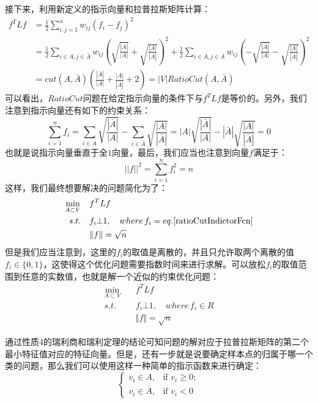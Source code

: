 \documentclass[UTF8, 12pt]{ctexart}
\begin{document}
接下来，利用新定义的指示向量和拉普拉斯矩阵计算：
\begin{align}
	{f^T}Lf & = \frac{1}{2}\sum\limits_{i,j = 1}^n {{w_{ij}}{{({f_i} - {f_j})}^2}} \\
	 & = \frac{1}{2}\sum\limits_{i \in A,j \in \bar A} {{w_{ij}}{{(\sqrt {\frac{{|\bar A|}}{{|A|}}}  + \sqrt {\frac{{|A|}}{{|\bar A|}}} )}^2}}  + \frac{1}{2}\sum\limits_{i \in A,j \in \bar A} {{w_{ij}}{{( - \sqrt {\frac{{|\bar A|}}{{|A|}}}  - \sqrt {\frac{{|A|}}{{|\bar A|}}} )}^2}} \\
	 & = cut(A,\bar A)(\frac{{|\bar A|}}{{|A|}} + \frac{{|A|}}{{|\bar A|}} + 2) = |V|RatioCut(A,\bar A)
\end{align}
可以看出，$RatioCut$问题在给定指示向量的条件下与${f^{T}Lf}$是等价的。另外，我们注意到指示向量还有如下的约束关系：
\begin{equation}
\sum\limits_{i = 1}^n {{f_i} = \sum\limits_{i \in A} {\sqrt {\frac{{|\bar A|}}{{|A|}}} } }  - \sum\limits_{i \in \bar A} {\sqrt {\frac{{|A|}}{{|\bar A|}}} }  = |A|\sqrt {\frac{{|\bar A|}}{{|A|}}}  - |\bar A|\sqrt {\frac{{|A|}}{{|\bar A|}}}  = 0
\end{equation}
也就是说指示向量垂直于全$1$向量，最后，我们应当也注意到向量$f$满足于：
\begin{equation}
||f|{|^2} = \sum\limits_{i = 1}^n {f_i^2 = n}
\end{equation}
这样，我们最终想要解决的问题简化为了：
\begin{align}
	\min_{A \subset V} & \quad f^{T}Lf \\
	s.t. & \quad f_{i} \bot 1, \quad where \, f_{i} = eq.\ref{ratioCutIndictorFcn} \\ 
	& \quad \Vert f \Vert = \sqrt{n}
\end{align}
但是我们应当注意到，这里的$f_{i}$的取值是离散的，并且只允许取两个离散的值$f_{i} \in \{0, 1\}$，这使得这个优化问题需要指数时间来进行求解。可以放松$f_{i}$的取值范围到任意的实数值，也就是解一个近似的约束优化问题：
\begin{align}
\min_{A \subset V} & \quad f^{T}Lf \\
s.t. & \quad f_{i} \bot 1, \quad where \, f_{i} \in R \\
& \quad \Vert f \Vert = \sqrt{n}
\end{align}

通过性质4的瑞利商和瑞利定理的结论可知问题的解对应于拉普拉斯矩阵的第二个最小特征值对应的特征向量。但是，还有一步就是说要确定样本点的归属于哪一个类的问题，那么我们可以使用这样一种简单的指示函数来进行确定：
\begin{equation}
\begin{cases}
{{v_i} \in A,} & \text{if } {v_i} \ge 0; \\
{{v_i} \in \bar A,} & \text{if } {v_i} < 0
\end{cases}
\end{equation}
\end{document}
